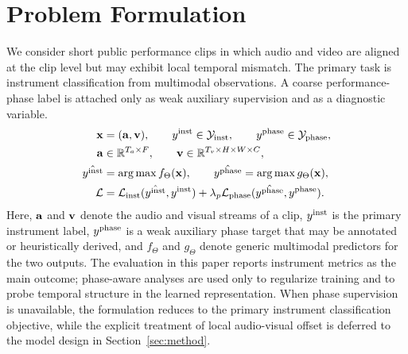 \section{Problem Formulation}
\label{sec:problem}

We consider short public performance clips in which audio and video are aligned at the clip level but may exhibit local temporal mismatch. The primary task is instrument classification from multimodal observations. A coarse performance-phase label is attached only as weak auxiliary supervision and as a diagnostic variable.
\begin{align}
\mathbf{x} &= (\mathbf{a}, \mathbf{v}), \qquad y^{\mathrm{inst}} \in \mathcal{Y}_{\mathrm{inst}}, \qquad y^{\mathrm{phase}} \in \mathcal{Y}_{\mathrm{phase}}, \\
\mathbf{a} &\in \mathbb{R}^{T_a \times F}, \qquad \mathbf{v} \in \mathbb{R}^{T_v \times H \times W \times C}, \\
\hat{y^{\mathrm{inst}}} &= \operatorname*{arg\,max} f_{\Theta}(\mathbf{x}), \qquad \hat{y^{\mathrm{phase}}} = \operatorname*{arg\,max} g_{\Theta}(\mathbf{x}), \\
\mathcal{L} &= \mathcal{L}_{\mathrm{inst}}(\hat{y^{\mathrm{inst}}}, y^{\mathrm{inst}}) + \lambda_p \mathcal{L}_{\mathrm{phase}}(\hat{y^{\mathrm{phase}}}, y^{\mathrm{phase}}).
\end{align}
Here, $\mathbf{a}$ and $\mathbf{v}$ denote the audio and visual streams of a clip, $y^{\mathrm{inst}}$ is the primary instrument label, $y^{\mathrm{phase}}$ is a weak auxiliary phase target that may be annotated or heuristically derived, and $f_{\Theta}$ and $g_{\Theta}$ denote generic multimodal predictors for the two outputs. The evaluation in this paper reports instrument metrics as the main outcome; phase-aware analyses are used only to regularize training and to probe temporal structure in the learned representation. When phase supervision is unavailable, the formulation reduces to the primary instrument classification objective, while the explicit treatment of local audio-visual offset is deferred to the model design in Section~\ref{sec:method}.
